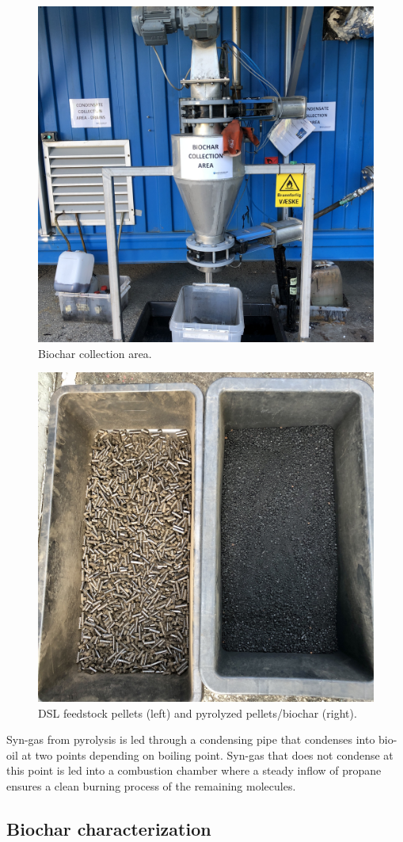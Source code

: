 \begin{figure}
    \centering
    \includegraphics[width=0.6\linewidth,scale=0.6]{Bilder/Pyrolysis/BiocharCollection.jpg}
    \caption{Biochar collection area.}
    \label{fig:biocharCollection}
\end{figure}

\begin{figure}
    \centering
    \includegraphics[width=0.6\linewidth,scale=0.6]{Bilder/Pyrolysis/Pellets.png}
    \caption{DSL feedstock pellets (left) and pyrolyzed pellets/biochar (right).}
    \label{fig:pellets}
\end{figure}

Syn-gas from pyrolysis is led through a condensing pipe that condenses into bio-oil at two points depending on boiling point. Syn-gas that does not condense at this point is led into a combustion chamber where a steady inflow of propane ensures a clean burning process of the remaining molecules.

\subsection{Biochar characterization}

